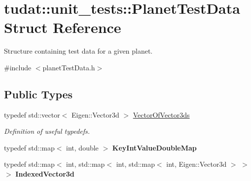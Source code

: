 \hypertarget{structtudat_1_1unit__tests_1_1PlanetTestData}{}\section{tudat\+:\+:unit\+\_\+tests\+:\+:Planet\+Test\+Data Struct Reference}
\label{structtudat_1_1unit__tests_1_1PlanetTestData}


Structure containing test data for a given planet.  




{\ttfamily \#include $<$planet\+Test\+Data.\+h$>$}

\subsection*{Public Types}
\begin{DoxyCompactItemize}
\item 
typedef std\+::vector$<$ Eigen\+::\+Vector3d $>$ \hyperlink{structtudat_1_1unit__tests_1_1PlanetTestData_a8c5d3fe2116951da135781145becea40}{Vector\+Of\+Vector3ds}\hypertarget{structtudat_1_1unit__tests_1_1PlanetTestData_a8c5d3fe2116951da135781145becea40}{}\label{structtudat_1_1unit__tests_1_1PlanetTestData_a8c5d3fe2116951da135781145becea40}

\begin{DoxyCompactList}\small\item\em Definition of useful typedefs. \end{DoxyCompactList}\item 
typedef std\+::map$<$ int, double $>$ {\bfseries Key\+Int\+Value\+Double\+Map}\hypertarget{structtudat_1_1unit__tests_1_1PlanetTestData_a6c27f16e62ef5c96cb2a8f785c3a2ac5}{}\label{structtudat_1_1unit__tests_1_1PlanetTestData_a6c27f16e62ef5c96cb2a8f785c3a2ac5}

\item 
typedef std\+::map$<$ int, std\+::map$<$ int, std\+::map$<$ int, Eigen\+::\+Vector3d $>$ $>$ $>$ {\bfseries Indexed\+Vector3d}\hypertarget{structtudat_1_1unit__tests_1_1PlanetTestData_afa5fcb5844eb994a7c7b0102df3451c1}{}\label{structtudat_1_1unit__tests_1_1PlanetTestData_afa5fcb5844eb994a7c7b0102df3451c1}

\end{DoxyCompactItemize}
